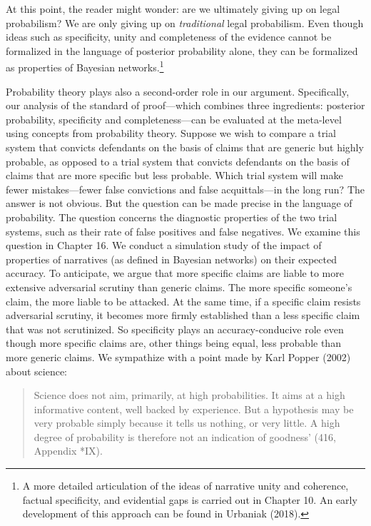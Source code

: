 \documentclass[
  10pt,
  dvipsnames,enabledeprecatedfontcommands]{scrartcl}
\begin{document}
\noindent  At this point, the reader might wonder: are we ultimately
giving up on legal probabilism? We are only giving up on
\emph{traditional} legal probabilism. Even though ideas such as
specificity, unity and completeness of the evidence cannot be formalized
in the language of posterior probability alone, they can be formalized
as properties of Bayesian networks.\footnote{A more detailed
  articulation of the ideas of narrative unity and coherence, factual
  specificity, and evidential gaps is carried out in Chapter 10. An
  early development of this approach can be found in Urbaniak (2018).}

Probability theory plays also a second-order role in our argument.
Specifically, our analysis of the standard of proof---which combines
three ingredients: posterior probability, specificity and
completeness---can be evaluated at the meta-level using concepts from
probability theory. Suppose we wish to compare a trial system that
convicts defendants on the basis of claims that are generic but highly
probable, as opposed to a trial system that convicts defendants on the
basis of claims that are more specific but less probable. Which trial
system will make fewer mistakes---fewer false convictions and false
acquittals---in the long run? The answer is not obvious. But the
question can be made precise in the language of probability. The
question concerns the diagnostic properties of the two trial systems,
such as their rate of false positives and false negatives. We examine
this question in Chapter 16. We conduct a simulation study of the impact
of properties of narratives (as defined in Bayesian networks) on their
expected accuracy.  To anticipate, we
argue that more specific claims are liable to more extensive adversarial
scrutiny than generic claims. The more specific someone's claim, the
more liable to be attacked. At the same time, if a specific claim
resists adversarial scrutiny, it becomes more firmly established than a
less specific claim that was not scrutinized. So specificity plays an
accuracy-conducive role even though more specific claims are, other
things being equal, less probable than more generic claims. We
sympathize with a point made by Karl Popper (2002) about science:

\begin{quote}
Science does not aim, primarily, at high probabilities. It aims at a high informative content, well backed by experience. But a hypothesis may be very probable simply because it tells us nothing, or very little. A high degree of probability is therefore not an indication of goodness' (416, Appendix *IX). 
\end{quote}
\end{document}
